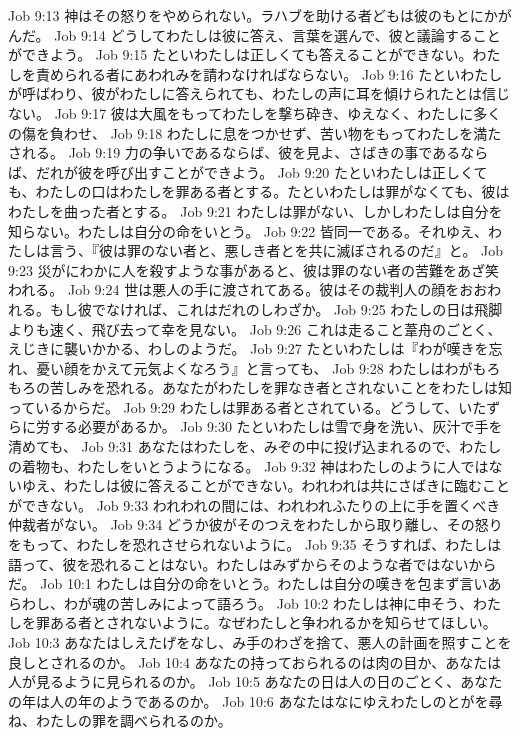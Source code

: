 Job 9:13  神はその怒りをやめられない。ラハブを助ける者どもは彼のもとにかがんだ。
Job 9:14  どうしてわたしは彼に答え、言葉を選んで、彼と議論することができよう。
Job 9:15  たといわたしは正しくても答えることができない。わたしを責められる者にあわれみを請わなければならない。
Job 9:16  たといわたしが呼ばわり、彼がわたしに答えられても、わたしの声に耳を傾けられたとは信じない。
Job 9:17  彼は大風をもってわたしを撃ち砕き、ゆえなく、わたしに多くの傷を負わせ、
Job 9:18  わたしに息をつかせず、苦い物をもってわたしを満たされる。
Job 9:19  力の争いであるならば、彼を見よ、さばきの事であるならば、だれが彼を呼び出すことができよう。
Job 9:20  たといわたしは正しくても、わたしの口はわたしを罪ある者とする。たといわたしは罪がなくても、彼はわたしを曲った者とする。
Job 9:21  わたしは罪がない、しかしわたしは自分を知らない。わたしは自分の命をいとう。
Job 9:22  皆同一である。それゆえ、わたしは言う、『彼は罪のない者と、悪しき者とを共に滅ぼされるのだ』と。
Job 9:23  災がにわかに人を殺すような事があると、彼は罪のない者の苦難をあざ笑われる。
Job 9:24  世は悪人の手に渡されてある。彼はその裁判人の顔をおおわれる。もし彼でなければ、これはだれのしわざか。
Job 9:25  わたしの日は飛脚よりも速く、飛び去って幸を見ない。
Job 9:26  これは走ること葦舟のごとく、えじきに襲いかかる、わしのようだ。
Job 9:27  たといわたしは『わが嘆きを忘れ、憂い顔をかえて元気よくなろう』と言っても、
Job 9:28  わたしはわがもろもろの苦しみを恐れる。あなたがわたしを罪なき者とされないことをわたしは知っているからだ。
Job 9:29  わたしは罪ある者とされている。どうして、いたずらに労する必要があるか。
Job 9:30  たといわたしは雪で身を洗い、灰汁で手を清めても、
Job 9:31  あなたはわたしを、みぞの中に投げ込まれるので、わたしの着物も、わたしをいとうようになる。
Job 9:32  神はわたしのように人ではないゆえ、わたしは彼に答えることができない。われわれは共にさばきに臨むことができない。
Job 9:33  われわれの間には、われわれふたりの上に手を置くべき仲裁者がない。
Job 9:34  どうか彼がそのつえをわたしから取り離し、その怒りをもって、わたしを恐れさせられないように。
Job 9:35  そうすれば、わたしは語って、彼を恐れることはない。わたしはみずからそのような者ではないからだ。
Job 10:1  わたしは自分の命をいとう。わたしは自分の嘆きを包まず言いあらわし、わが魂の苦しみによって語ろう。
Job 10:2  わたしは神に申そう、わたしを罪ある者とされないように。なぜわたしと争われるかを知らせてほしい。
Job 10:3  あなたはしえたげをなし、み手のわざを捨て、悪人の計画を照すことを良しとされるのか。
Job 10:4  あなたの持っておられるのは肉の目か、あなたは人が見るように見られるのか。
Job 10:5  あなたの日は人の日のごとく、あなたの年は人の年のようであるのか。
Job 10:6  あなたはなにゆえわたしのとがを尋ね、わたしの罪を調べられるのか。
